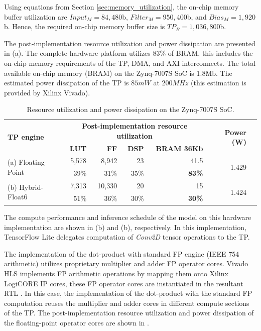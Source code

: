 Using equations from Section \ref{sec:memory_utilization}, the on-chip memory buffer utilization are $Input_M=84,480$b, $Filter_M=950,400$b, and $Bias_M=1,920$b. Hence, the required on-chip memory buffer size is $TP_B=1,036,800$b.

The post-implementation resource utilization and power dissipation are presented in (a). The complete hardware platform utilizes 83\% of BRAM, this includes the on-chip memory requirements of the TP, DMA, and AXI interconnects. The total available on-chip memory (BRAM) on the Zynq-7007S SoC is 1.8Mb. The estimated power dissipation of the TP is $85mW$ at $200MHz$ (this estimation is provided by Xilinx Vivado).

\begin{table}[!h]\centering
	\caption{Resource utilization and power dissipation on the Zynq-7007S SoC.}\label{tab:resource_utilization}
	\scriptsize
	\begin{tabular}{lrrrrrr}\toprule
		\multirow{2}{*}{\textbf{TP engine}} &\multicolumn{4}{c}{\textbf{Post-implementation resource utilization}} &\multirow{2}{*}{\textbf{Power (W)}} \\\cmidrule{2-5}
		&\textbf{LUT} &\textbf{FF} &\textbf{DSP} &\textbf{BRAM 36Kb} & \\\midrule
		\multirow{2}{*}{(a) Floating-Point} &5,578 &8,942 &23 &41.5 &\multirow{2}{*}{1.429} \\
		&39\% &31\% &35\% &\textbf{83\%} & \\
		\multirow{2}{*}{(b) Hybrid-Float6} &7,313 &10,330 &20 &15 &\multirow{2}{*}{1.424} \\
		&51\% &36\% &30\% &\textbf{30\%} & \\
		\bottomrule
	\end{tabular}
\end{table}

The compute performance and inference schedule of the model on this hardware implementation are shown in (b) and (b), respectively. In this implementation, TensorFlow Lite delegates computation of \emph{Conv2D} tensor operations to the TP.

The implementation of the dot-product with standard FP engine (IEEE 754 arithmetic) utilizes proprietary multiplier and adder FP operator cores. Vivado HLS implements FP arithmetic operations by mapping them onto Xilinx LogiCORE IP cores, these FP operator cores are instantiated in the resultant RTL \cite{hrica2012floating}. In this case, the implementation of the dot-product with the standard FP computation reuses the multiplier and adder cores in different compute sections of the TP. The post-implementation resource utilization and power dissipation of the floating-point operator cores are shown in .

